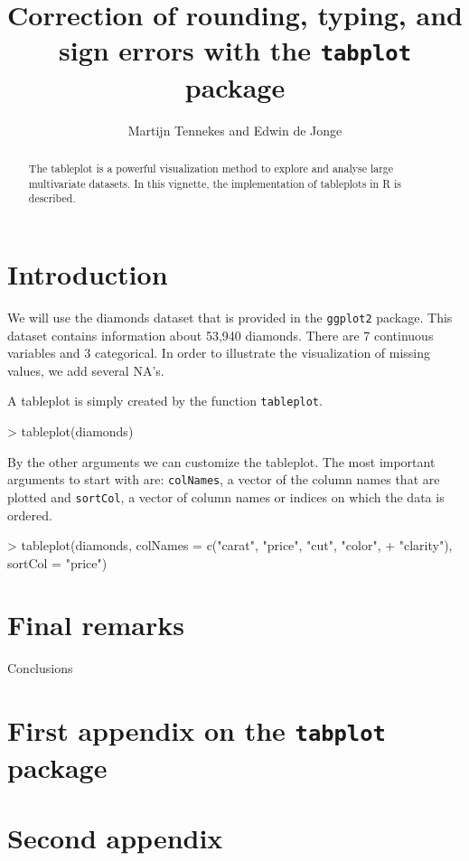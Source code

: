 \documentclass[11pt, fleqn, a4paper]{article}
\title{Correction of rounding, typing, and sign errors with the {\tt tabplot} package}
\author{Martijn Tennekes and Edwin de Jonge}
\begin{document}
\maketitle
\begin{abstract}

The tableplot is a powerful visualization method to explore and analyse large multivariate datasets. In this vignette, the implementation of tableplots in R is described. 


\end{abstract}

\maketitle

\newpage

\tableofcontents
\listofalgorithms
\newpage
\section{Introduction}
We will use the diamonds dataset that is provided in the {\tt ggplot2} package. This dataset contains information about 53,940 diamonds. There are 7 continuous variables and 3 categorical. In order to illustrate the visualization of missing values, we add several NA's.

\begin{Schunk}
\end{Schunk}

A tableplot is simply created by the function {\tt tableplot}.
\begin{Schunk}
\begin{Sinput}
> tableplot(diamonds)
\end{Sinput}
\end{Schunk}

By the other arguments we can customize the tableplot. The most important arguments to start with are: {\tt colNames}, a vector of the column names that are plotted and {\tt sortCol}, a vector of column names or indices on which the data is ordered.
\begin{Schunk}
\begin{Sinput}
> tableplot(diamonds, colNames = c("carat", "price", "cut", "color", 
+     "clarity"), sortCol = "price")
\end{Sinput}
\end{Schunk}



\section{Final remarks}
Conclusions


%
%

\newpage
\appendix
\section{First appendix on the {\tt tabplot} package}
\section{Second appendix}
\end{document}
